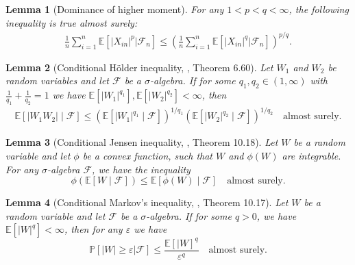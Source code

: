 \documentclass[12pt]{article}
\newtheorem{lemma}{Lemma}
\theoremstyle{definition}
\def\P{\mathbb{P}}
\def\P{\mathbb{P}}
\newcommand{\E}{\mathbb E}								%
\renewcommand{\P}{\mathbb{P}}							%
\begin{document}
\begin{lemma}[Dominance of higher moment]\label{lem:moment_dominance}
  For any $1<p<q<\infty$, the following inequality is true almost surely:
  \begin{align*}
    \frac{1}{n}\sum_{i=1}^n \E[|X_{in}|^{p}|\mathcal{F}_n]\leq \left(\frac{1}{n}\sum_{i=1}^n \E[|X_{in}|^{q}|\mathcal{F}_n]\right)^{p/q}.
  \end{align*}
\end{lemma}


\begin{lemma}[Conditional H\"older inequality, \cite{Swanson2019}, Theorem 6.60]\label{lem:cond_holder}
	Let $W_1$ and $W_2$ be random variables and let $\mathcal F$ be a $\sigma$-algebra. If for some $q_1, q_2 \in (1,\infty)$ with $\frac{1}{q_1} + \frac{1}{q_2} = 1$ we have $\E[|W_1|^{q_1}], \E[|W_2|^{q_2}] < \infty$, then
	\begin{align*}
		\E[|W_1 W_2| \mid \mathcal F] \leq (\E[|W_1|^{q_1} \mid \mathcal F])^{1/q_1}(\E[|W_2|^{q_2} \mid \mathcal F])^{1/q_2} \quad \text{almost surely}.
	\end{align*}
\end{lemma}

\begin{lemma}[Conditional Jensen inequality, \cite{Davidson2003}, Theorem 10.18] \label{lem:conditional-jensen}
	Let $W$ be a random variable and let $\phi$ be a convex function, such that $W$ and $\phi(W)$ are integrable. For any $\sigma$-algebra $\mathcal F$, we have the inequality
	\begin{equation*}
		\phi(\E[W \mid \mathcal F]) \leq  \E[\phi(W) \mid \mathcal F] \quad \text{almost surely}.
	\end{equation*}
\end{lemma}

\begin{lemma}[Conditional Markov's inequality, \cite{Davidson2003}, Theorem 10.17]\label{lem:conditional_Markov}
  Let $W$ be a random variable and let $\mathcal{F}$ be a $\sigma$-algebra. If for some $q>0$, we have $\E[|W|^q]<\infty$, then for any $\varepsilon$ we have
	\begin{equation*}
		\P[|W|\geq \varepsilon|\mathcal{F}]\leq \frac{\E[|W]^q}{\varepsilon^q}\quad\text{almost surely}.
	\end{equation*}
\end{lemma}
\end{document}

